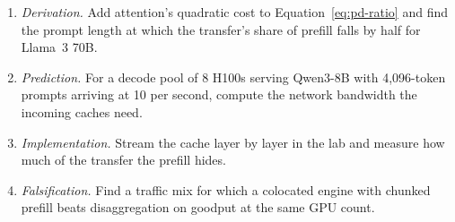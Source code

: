 \begin{enumerate}
\item \emph{Derivation.} Add attention's quadratic cost to
  Equation~\ref{eq:pd-ratio} and find the prompt length at which the transfer's
  share of prefill falls by half for Llama~3 70B.
\item \emph{Prediction.} For a decode pool of 8 H100s serving Qwen3-8B with
  4,096-token prompts arriving at 10 per second, compute the network bandwidth
  the incoming caches need.
\item \emph{Implementation.} Stream the cache layer by layer in the lab and
  measure how much of the transfer the prefill hides.
\item \emph{Falsification.} Find a traffic mix for which a colocated engine
  with chunked prefill beats disaggregation on goodput at the same GPU count.
\end{enumerate}
